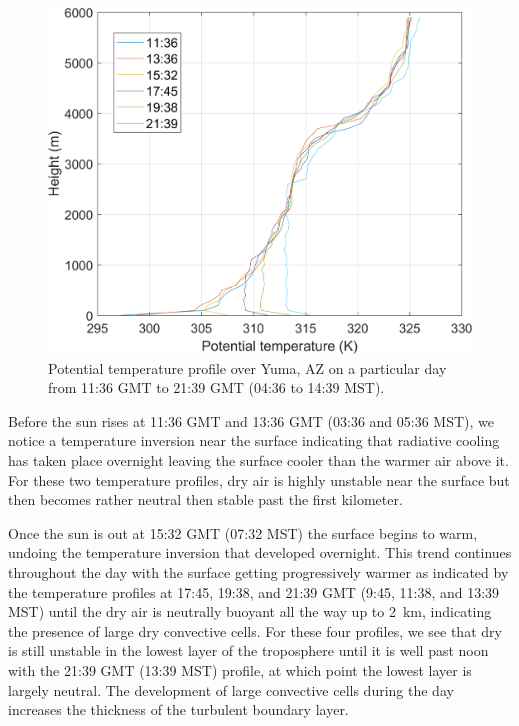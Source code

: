 \documentclass[11pt]{article}
\begin{document}
\begin{figure}[h!]
	\centering
	\includegraphics[width=\textwidth]{YumaPotentialTemp.png}
	\caption{Potential temperature profile over Yuma, AZ on a particular day from 11:36 GMT to 21:39 GMT (04:36 to 14:39 MST).}
	\label{fig:YumaPotentialT}
\end{figure}

Before the sun rises at 11:36 GMT and 13:36 GMT (03:36 and 05:36 MST), we notice a temperature inversion near the surface indicating that radiative cooling has taken place overnight leaving the surface cooler than the warmer air above it. For these two temperature profiles, dry air is highly unstable near the surface but then becomes rather neutral then stable past the first kilometer.

Once the sun is out at 15:32 GMT (07:32 MST) the surface begins to warm, undoing the temperature inversion that developed overnight. This trend continues throughout the day with the surface getting progressively warmer as indicated by the temperature profiles at 17:45, 19:38, and 21:39 GMT (9:45, 11:38, and 13:39 MST) until the dry air is neutrally buoyant all the way up to \SI{2}{\km}, indicating the presence of large dry convective cells. For these four profiles, we see that dry is still unstable in the lowest layer of the troposphere until it is well past noon with the 21:39 GMT (13:39 MST) profile, at which point the lowest layer is largely neutral. The development of large convective cells during the day increases the thickness of the turbulent boundary layer.
\end{document}

